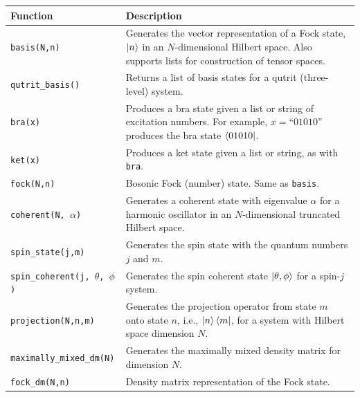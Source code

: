 \documentclass[preprint,3p,sort&compress]{elsarticle}
\def\code#1{\texttt{#1}}
\begin{document}
\begin{table}[ht]
     \renewcommand{\arraystretch}{1.25} 
    \centering
    \begin{tabular}{@{}lp{10cm}@{}}
        \toprule
        \textbf{Function} & \textbf{Description} \\
        \midrule
        \code{basis(N,n)} & Generates the vector representation of a Fock state, $\ket{n}$ in an $N$-dimensional Hilbert space. Also supports lists for construction of tensor spaces. \\
    
        \code{qutrit\_basis()} & Returns a list of basis states for a qutrit (three-level) system. \\
        
        \code{bra(x)} & Produces a bra state given a list or string of excitation numbers. For example, $x=\text{``01010''}$ produces the bra state $\bra{01010}$. \\
        
        \code{ket(x)} & Produces a ket state given a list or string, as with \code{bra}. \\
        
        \code{fock(N,n)} & Bosonic Fock (number) state. Same as \code{basis}. \\
        
        \code{coherent(N, $\alpha$)} & Generates a coherent state with eigenvalue $\alpha$ for a harmonic oscillator in an $N$-dimensional truncated Hilbert space. \\
        
        \code{spin\_state(j,m)} & Generates the spin state with the quantum numbers $j$ and $m$. \\
        
        \code{spin\_coherent(j, $\theta$, $\phi$)} & Generates the spin coherent state $\ket{\theta, \phi}$ for a spin-$j$ system. \\
        
        \code{projection(N,n,m)} & Generates the projection operator from state $m$ onto state $n$, i.e., $\ket{n}\bra{m}$, for a system with Hilbert space dimension $N$. \\
       
        \code{maximally\_mixed\_dm(N)} & Generates the maximally mixed density matrix for dimension $N$.\\
       
        \code{fock\_dm(N,n)} & Density matrix representation of the Fock state. \\
        

\end{tabular}
\end{table}
\end{document}
